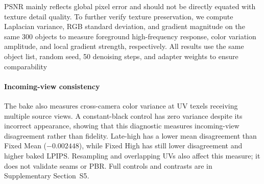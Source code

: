 \documentclass[times,twocolumn,final]{elsarticle}
\providecommand{\DIFadd}[1]{{\protect\color{blue} \sf #1}} %
\providecommand{\DIFdel}[1]{{\protect\color{red} \scriptsize #1}} %
\providecommand{\DIFaddbegin}{} %
\providecommand{\DIFaddend}{} %
\providecommand{\DIFdelbegin}{} %
\providecommand{\DIFdelend}{} %
\begin{document}
\DIFdelbegin \DIFdel{PSNR mainly reflects global pixel error and should not be directly equated with texture detail quality. To further verify texture preservation, we compute Laplacian variance, RGB standard deviation, and gradient magnitude on the same 300 objects to measure foreground high-frequency response, color variation amplitude, and local gradient strength, respectively. All results use the same object list, random seed, 50 denoising steps, and adapter weights to ensure comparability}\DIFdelend \DIFaddbegin \paragraph{Incoming-view consistency}
\DIFadd{The bake also measures cross-camera color variance at UV texels receiving multiple source views. A constant-black control has zero variance despite its incorrect appearance, showing that this diagnostic measures incoming-view disagreement rather than fidelity. Late-high has a lower mean disagreement than Fixed Mean ($-0.002448$), while Fixed High has still lower disagreement and higher baked LPIPS. Resampling and overlapping UVs also affect this measure; it does not validate seams or PBR. Full controls and contrasts are in Supplementary Section~S5}\DIFaddend .
\end{document}
